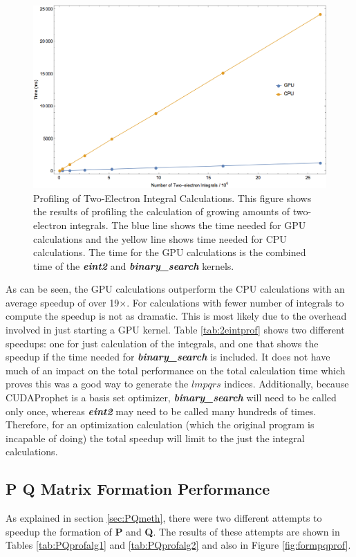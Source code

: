 \documentclass[12pt]{report}
\newcommand{\kernel}[1]{\textit{\textbf{#1}}}
\begin{document}
\begin{figure}[h!]
\includegraphics[width=1\textwidth]{Figures/eint2prof.png}
\caption[Profiling of Two-Electron Integral Calculations]
{Profiling of Two-Electron Integral Calculations. This figure shows the results of profiling the calculation of growing amounts of two-electron integrals. The blue line shows the time needed for GPU calculations and the yellow line shows time needed for CPU calculations. The time for the GPU calculations is the combined time of the \kernel{eint2} and \kernel{binary\_search} kernels.}
\label{fig:2eintprof}
\end{figure}

As can be seen, the GPU calculations outperform the CPU calculations with an average speedup of over 19$\times$. For calculations with fewer number of integrals to compute the speedup is not as dramatic. This is most likely due to the overhead involved in just starting a GPU kernel. Table \ref{tab:2eintprof} shows two different speedups: one for just calculation of the integrals, and one that shows the speedup if the time needed for \kernel{binary\_search} is included. It does not have much of an impact on the total performance on the total calculation time which proves this was a good way to generate the $lmpqrs$ indices. Additionally, because CUDAProphet is a basis set optimizer, \kernel{binary\_search} will need to be called only once, whereas \kernel{eint2} may need to be called many hundreds of times. Therefore, for an optimization calculation (which the original program is incapable of doing) the total speedup will limit to the just the integral calculations.

\subsection{P Q Matrix Formation Performance}
As explained in section \ref{sec:PQmeth}, there were two different attempts to speedup the formation of \textbf{P} and \textbf{Q}. The results of these attempts are shown in Tables \ref{tab:PQprofalg1} and \ref{tab:PQprofalg2} and also in Figure \ref{fig:formpqprof}.
\end{document}

